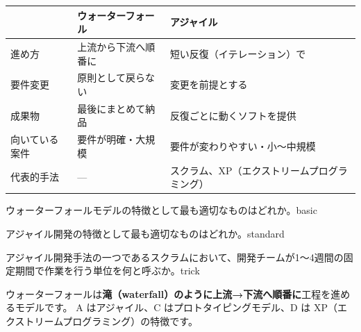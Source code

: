 \begin{comparison}
\begin{tabularx}{\textwidth}{lXX}
  \toprule
  & \textbf{ウォーターフォール} & \textbf{アジャイル} \\
  \midrule
  進め方 & 上流から下流へ順番に & 短い反復（イテレーション）で \\
  要件変更 & 原則として戻らない & 変更を前提とする \\
  成果物 & 最後にまとめて納品 & 反復ごとに動くソフトを提供 \\
  向いている案件 & 要件が明確・大規模 & 要件が変わりやすい・小〜中規模 \\
  代表的手法 & — & スクラム、XP（エクストリームプログラミング） \\
  \bottomrule
\end{tabularx}
\end{comparison}


\begin{mondai}{ウォーターフォールモデルの特徴として最も適切なものはどれか。}{basic}
\end{mondai}

\begin{mondai}{アジャイル開発の特徴として最も適切なものはどれか。}{standard}
\end{mondai}

\begin{mondai}{アジャイル開発手法の一つであるスクラムにおいて、開発チームが1〜4週間の固定期間で作業を行う単位を何と呼ぶか。}{trick}
\end{mondai}

\kaitoupage

\begin{kaisetsu}
ウォーターフォールは\textbf{滝（waterfall）のように上流→下流へ順番に}工程を進めるモデルです。
A はアジャイル、C はプロトタイピングモデル、D は XP（エクストリームプログラミング）の特徴です。
\end{kaisetsu}

